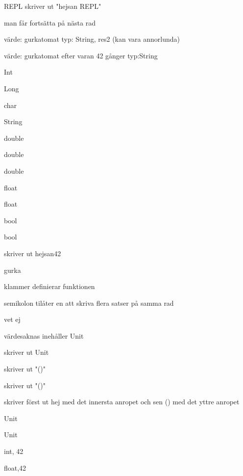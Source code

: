 
\ExerciseSolution{\ExeWeekONE}

\BasicTasks %

\Task %

\Subtask REPL skriver ut "hejsan REPL"

\Subtask man får fortsätta på nästa rad

\Subtask värde: gurkatomat typ: String, res2 (kan vara annorlunda)

\Subtask värde: gurkatomat efter varan 42 gånger typ:String

\Subtask 

\Task %
 
\Task %

\Subtask Int

\Subtask Long

\Subtask char

\Subtask String

\Subtask double

\Subtask double

\Subtask double

\Subtask float

\Subtask float

\Subtask bool

\Subtask bool


\Task %
\Subtask skriver ut hejsan42

\Subtask gurka

\Subtask klammer definierar funktionen

\Subtask semikolon tilåter en att skriva flera satser på samma rad

\Task %
\Subtask  vet ej

\Subtask 

\Subtask 

\Subtask värdesaknas inehåller Unit

\Subtask skriver ut Unit

\Subtask skriver ut "()"

\Subtask skriver ut "()"

\Subtask skriver först ut hej med det innersta anropet och sen () med det yttre anropet

\Subtask  Unit

\Subtask  Unit

\Task %

\Subtask  int, 42

\Subtask float,42

